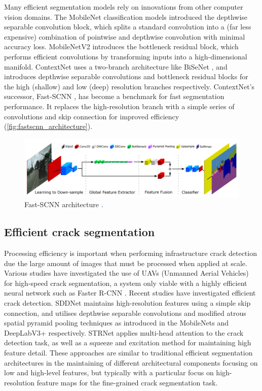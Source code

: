 \documentclass[a4paper,12pt]{report}
\begin{document}
Many efficient segmentation models rely on innovations from other computer vision domains. The MobileNet \cite{howard_mobilenets_2017} classification models introduced the depthwise separable convolution block, which splits a standard convolution into a (far less expensive) combination of pointwise and depthwise convolution with minimal accuracy loss. MobileNetV2 \cite{sandler_mobilenetv2_2019} introduces the bottleneck residual block, which performs efficient convolutions by transforming inputs into a high-dimensional manifold. ContextNet \cite{poudel_contextnet_2018} uses a two-branch architecture like BiSeNet \cite{yu_bisenet_2018}, and introduces depthwise separable convolutions and bottleneck residual blocks for the high (shallow) and low (deep) resolution branches respectively. ContextNet’s successor, Fast-SCNN \cite{poudel_fast-scnn_2019}, has become a benchmark for fast segmentation performance. It replaces the high-resolution branch with a simple series of convolutions and skip connection for improved efficiency (\autoref{fig:fastscnn_architecture}).

\begin{figure}[h]
    \centering
    \includegraphics[width=\textwidth]{res/fastscnn-architecture.png}
    \caption{Fast-SCNN architecture \cite{poudel_fast-scnn_2019}.}
    \label{fig:fastscnn_architecture}
\end{figure}

\subsection{Efficient crack segmentation}
Processing efficiency is important when performing infrastructure crack detection due the large amount of images that must be processed when applied at scale. Various studies \cite{kerle_uav-based_2020} \cite{kang_autonomous_2018} have investigated the use of UAVs (Unmanned Aerial Vehicles) for high-speed crack segmentation, a system only viable with a highly efficient neural network such as Faster R-CNN \cite{ali_real-time_2021}. Recent studies have investigated efficient crack detection. SDDNet \cite{choi_sddnet_2019} maintains high-resolution features using a simple skip connection, and utilises depthwise separable convolutions and modified atrous spatial pyramid pooling techniques as introduced in the MobileNets \cite{howard_mobilenets_2017} and DeepLabV3+ \cite{chen_rethinking_2017} respectively. STRNet \cite{kang_efficient_2021} applies multi-head attention to the crack detection task, as well as a squeeze and excitation method for maintaining high feature detail.
These approaches are similar to traditional efficient segmentation architectures in the maintaining of different architectural components focusing on low and high-level features, but typically with a particular focus on high-resolution feature maps for the fine-grained crack segmentation task.
\end{document}
